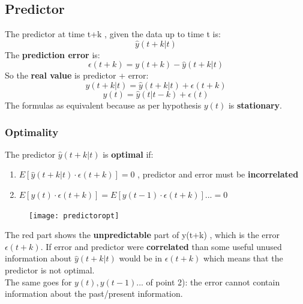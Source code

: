 \subsection{Predictor}
The predictor at time t+k , given the data up to time t is:
$$ \hat{y}(t+k|t) $$
The \textbf{prediction error} is: 
$$  \epsilon(t+k) = y(t+k)- \hat{y}(t + k|t)$$
So the \textbf{real value } is predictor + error:
$$ y(t+k|t) = \hat{y}(t+k|t) + \epsilon(t+k)$$
$$ y(t) = \hat{y}(t|t-k) + \epsilon(t) $$
The formulas as equivalent because as per hypothesis $y(t)$ is \textbf{stationary}.
\subsubsection{Optimality}
The predictor $ \hat{y}(t+k|t) $ is \textbf{optimal} if:
\begin{enumerate}
\item $ E[\hat{y}(t+k|t) \cdot \epsilon(t+k)]=0 $ , predictor and error must be \textbf{incorrelated}
\item $ E[y(t) \cdot \epsilon(t+k)] = E[y(t-1) \cdot \epsilon(t+k)]... = 0$
\end{enumerate}
\begin{figure}[H]
 \centering
  \texttt{[image: predictoropt]}
\end{figure}
The red part shows the \textbf{unpredictable} part of y(t+k) , which is the error $\epsilon(t+k)$. If error and predictor were \textbf{correlated} than some useful unused information about $\hat{y}(t+k|t)$ would be in $\epsilon(t+k)$ which means that the predictor is not optimal.\\
The same goes for $y(t) , y(t-1)...$ of point 2): the error cannot contain information about the past/present information.\\

